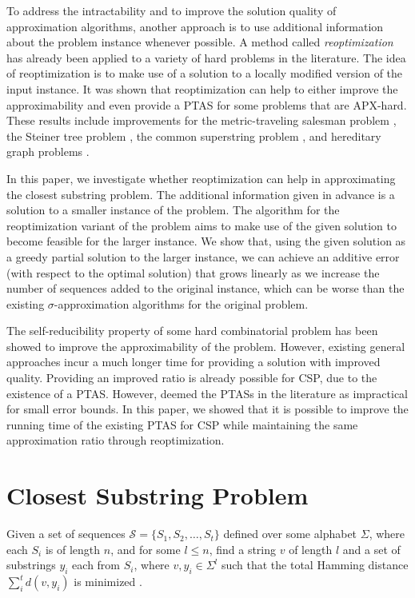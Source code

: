 \documentclass[journal]{acm_proc_article-sp}
\begin{document}
To address the intractability and to improve the solution quality of approximation algorithms, another approach is to use additional information about the problem instance whenever possible. A method called \textit{reoptimization} has already been applied to a variety of hard problems in the literature. The idea of reoptimization is to make use of a solution to a locally modified version of the input instance. It was shown that reoptimization can help to either improve the approximability and even provide a PTAS for some problems that are APX-hard. These results include improvements for the metric-traveling salesman problem \cite{Bockenhauer2008}, the Steiner tree problem \cite{Bilo2012}, the common superstring problem  \cite{Bilo2011}, and hereditary graph problems \cite{Boria2012}.

In this paper, we investigate whether reoptimization can help in approximating the closest substring problem. The additional information given in advance is a solution to a smaller instance of the problem. The algorithm for the reoptimization variant of the problem aims to make use of the given solution to become feasible for the larger instance. We show that, using the given solution as a greedy partial solution to the larger instance, we can achieve an additive error (with respect to the optimal solution) that grows linearly as we increase the number of sequences added to the original instance, which can be worse than the existing $\sigma$-approximation algorithms for the original problem. 

The self-reducibility property of some hard combinatorial problem has been showed to improve the approximability of the problem. However, existing general approaches incur a much longer time for providing a solution with improved quality. Providing an improved ratio is already possible for CSP, due to the existence of  a PTAS.   However, \cite{Wang2008} deemed the PTASs in the literature as impractical for small error bounds. In this paper, we showed that it is possible to improve the running time of the existing PTAS  for CSP while maintaining the same approximation ratio through reoptimization.

\section{Closest Substring Problem}
Given a set of sequences $\mathcal{S} = \{S_1, S_2, \ldots ,S_t \}$ defined over some alphabet $\Sigma$, where each $S_i$ is of length $n$, and for some $l \leq n$, find a string $v$ of length $l$ and a set of substrings $y_i$ each from $S_i$, where $v, y_i \in \Sigma^l$  such that the total Hamming distance $\sum\limits_{i}^t d(v, y_i)$ is minimized \cite{Garey1979}.
\end{document}
